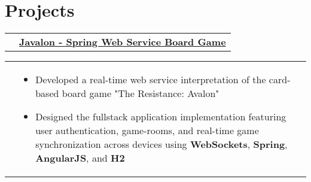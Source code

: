 \documentclass[11.9pt,letterpaper,sans]{moderncv}
\begin{document}
\renewcommand*{\cvitem}[3][.25em]{%
  \begin{tabular}{@{}b{\hintscolumnwidth}@{\hspace{\separatorcolumnwidth}}b{\maincolumnwidth}@{}}%
      \raggedleft\hintstyle{#2} &{#3}%
  \end{tabular}%
  \par\addvspace{#1}}

\vspace*{-0.3cm}

\setlength{\hintscolumnwidth}{0.1\textwidth}

\section{\textbf{Projects}}
\setlength{\hintscolumnwidth}{0.00000000000000000001\textwidth}
	\cvitem{}{\textbf{\href{http://github.com/lichenma/Javalon}{Javalon - Spring Web Service Board Game}}}
        \vspace*{-0.1cm}
        \cvitem{}{
            {\footnotesize
                \begin{itemize}
                \item Developed a real-time web service interpretation of the card-based board game "The Resistance: Avalon"
		\item Designed the fullstack application implementation featuring user authentication, game-rooms, and real-time game synchronization across devices   using \textbf{WebSockets}, \textbf{Spring}, \textbf{AngularJS}, and \textbf{H2} 
                \end{itemize}
            }
        }
	
\end{document}
